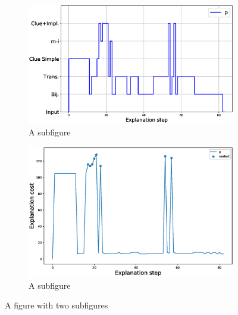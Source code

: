 \begin{figure}
\centering
\begin{subfigure}{.5\textwidth}
	\centering
	\includegraphics[width=0.98\linewidth]{figures/plot_cost_steps_p.eps}
	\caption{A subfigure}
	\label{fig:sub1}
\end{subfigure}%
\begin{subfigure}{.5\textwidth}
	\centering
	\includegraphics[width=0.9\linewidth]{figures/p.eps}
	\caption{A subfigure}
	\label{fig:sub2}
\end{subfigure}
\caption{A figure with two subfigures}
\label{fig:test}
\end{figure}

